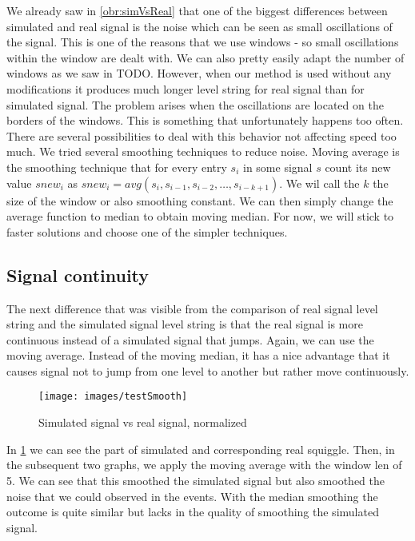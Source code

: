 We already saw in \ref{obr:simVsReal} that one of the biggest differences between simulated and
real signal is the noise which can be seen as small oscillations of the signal. This is
one of the reasons that we use windows - so small oscillations within the window
are dealt with. We can also pretty easily adapt the number of windows as we saw in TODO.
However, when our method is used without any modifications it
produces much longer level string for real signal than for simulated signal.
The problem arises when the oscillations are located on the borders of the windows.
This is something that unfortunately happens too often.
There are several possibilities to deal with this behavior not affecting speed too
much. We tried several smoothing techniques to reduce noise. Moving average is the
smoothing technique that for every entry $s_i$ in some signal $s$ count its new value
$snew_i$ as $snew_i = avg(s_{i}, s_{i-1}, s_{i-2}, \dots , s_{i-k+1})$. We wil call the
$k$ the size of the window or also smoothing constant. We can then simply change
the average function to median to obtain moving median.
For now, we will stick to faster solutions and choose one of the simpler techniques.

\subsection{Signal continuity}

The next difference that was visible from the comparison of real signal level string
and the simulated signal level string is that the real signal is more continuous instead
of a simulated signal that jumps. Again, we can use the moving average. Instead of
the moving median, it has a nice advantage that it causes signal not to jump from
one level to another but rather move continuously.

\begin{figure}
\centerline{\texttt{[image: images/testSmooth]}}
\caption[Hehe]{Simulated signal vs real signal, normalized}
\label{obr:testSmooth}
\end{figure}

In \ref{obr:testSmooth} we can see the part of simulated and corresponding real squiggle.
Then, in the subsequent two graphs, we apply the moving average with the window len
of 5. We can see that this smoothed the simulated signal but also smoothed the noise
that we could observed in the events. With the median smoothing the outcome is quite
similar but lacks in the quality of smoothing the simulated signal.

